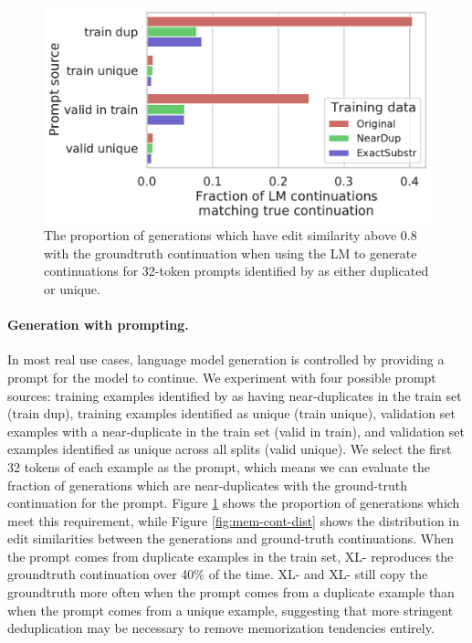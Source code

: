 \begin{figure}
    \centering
    \small
    \includegraphics[width=0.6\linewidth]{figures/memorized_continuations_fraction}
    \caption{The proportion of generations which have edit similarity above 0.8 with the groundtruth continuation when using the LM to generate continuations for 32-token prompts identified by \Approx{} as either duplicated or unique.}
    \label{fig:ground-truth-continuation}
\end{figure}
\paragraph{Generation with prompting.}
In most real use cases, language model generation is controlled by providing a prompt for the model to continue.
We experiment with four possible prompt sources: training examples identified by \Exact{} as having near-duplicates in the train set (train dup), training examples identified as unique (train unique), validation set examples with a near-duplicate in the train set (valid in train), and validation set examples identified as unique across all splits (valid unique).
We select the first 32 tokens of each example as the prompt, which means we can evaluate the fraction of generations which are near-duplicates with the ground-truth continuation for the prompt.
Figure \ref{fig:ground-truth-continuation} shows the proportion of generations which meet this requirement, while Figure \ref{fig:mem-cont-dist} shows the distribution in edit similarities between the generations and ground-truth continuations.
When the prompt comes from duplicate examples in the train set, XL-\Original{} reproduces the groundtruth continuation over 40\% of the time.
XL-\Exact{} and XL-\Approx{} still copy the groundtruth more often when the prompt comes from a duplicate example than when the prompt comes from a unique example, suggesting that more stringent deduplication may be necessary to remove memorization tendencies entirely. 


